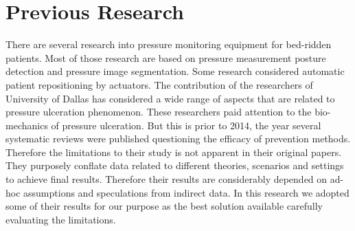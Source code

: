\section{Previous Research}
There are several research into pressure monitoring equipment for bed-ridden patients. Most of those research are based on pressure measurement posture detection and pressure image segmentation. Some research considered automatic patient repositioning by actuators. \cite{smartmat,smartmat2}  The contribution of the researchers of University of Dallas has considered a wide range of aspects that are related to pressure ulceration phenomenon. \cite{schedule}  These researchers paid attention to the bio-mechanics of pressure ulceration. But this is prior to 2014, the year several systematic reviews were published questioning the efficacy of prevention methods. Therefore the limitations to their study is not apparent in their original papers. They purposely conflate data related to different theories, scenarios and settings to achieve final results. Therefore their results are considerably depended on ad-hoc assumptions and speculations from indirect data. In this research we adopted some of their results for our purpose as the best solution available carefully evaluating the limitations.


